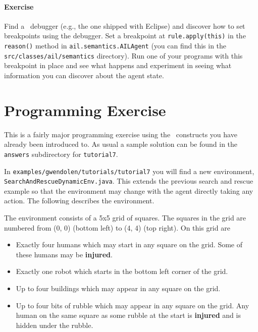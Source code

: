 \begin{sloppypar}
\paragraph{Exercise} Find a \java\ debugger (e.g., the one shipped with Eclipse) and discover how to set breakpoints using the debugger.  Set a breakpoint at \texttt{rule.apply(this)} in the \texttt{reason()} method in \texttt{ail.semantics.AILAgent} (you can find this in the \texttt{src/classes/ail/semantics} directory).  Run one of your programs with this breakpoint in place and see what happens and experiment in seeing what information you can discover about the agent state.
\end{sloppypar}

\section{Programming Exercise}
This is a fairly major programming exercise using the \gwendolen\ constructs you have already been introduced to.  As usual a sample solution can be found in the \texttt{answers} subdirectory for \texttt{tutorial7}.

In \texttt{examples/gwendolen/tutorials/tutorial7} you will find a new environment, \texttt{SearchAndRescueDynamicEnv.java}.  This extends the previous search and rescue example so that the environment may change with the agent directly taking any action.  The following describes the environment.

The environment consists of a 5x5 grid of squares.  The squares in the grid are numbered from (0, 0) (bottom left) to (4, 4) (top right).  On this grid are
\begin{itemize}
\item Exactly four humans which may start in any square on the grid.  Some of these humans may be {\bf injured}.
\item Exactly one robot which starts in the bottom left corner of the grid.
\item Up to four buildings which may appear in any square on the grid.
\item Up to four bits of rubble which may appear in any square on the grid.  Any human on the same square as some rubble at the start is {\bf injured} and is hidden under the rubble.
\end{itemize}

